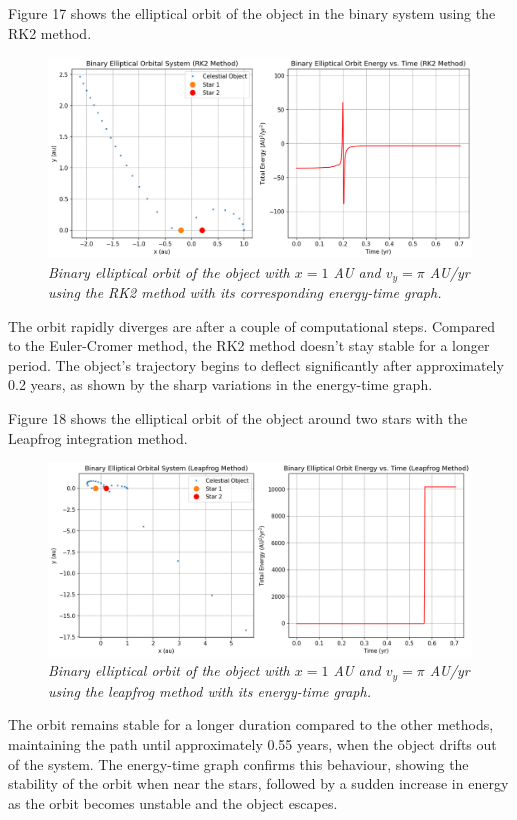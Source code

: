 \documentclass[11 pt, a4paper, twocolumn]{article}
\begin{document}
Figure 17 shows the elliptical orbit of the object in the binary system using the RK2 method.
\begin{figure}[H]
  \includegraphics[width=1\linewidth]{binaryrk2elliptic.png}
  \centering
  \caption{\textit{Binary elliptical orbit of the object with $x = 1$ AU and $v_y = \pi$ AU/yr using 
  the RK2 method with its corresponding energy-time graph.}} 
\end{figure}
The orbit rapidly diverges are after a couple of computational steps. Compared to the Euler-Cromer method,
the RK2 method doesn't stay stable for a longer period. The object's trajectory begins to deflect significantly
after approximately 0.2 years, as shown by the sharp variations in the energy-time graph.

Figure 18 shows the elliptical orbit of the object around two stars with the Leapfrog integration method.
\begin{figure}[H]
  \includegraphics[width=1\linewidth]{binaryleapfrogelliptic.png}
  \centering
  \caption{\textit{Binary elliptical orbit of the object with $x = 1$ AU and $v_y = \pi$ AU/yr using 
  the leapfrog method with its energy-time graph.}} 
\end{figure}
The orbit remains stable for a longer duration compared to the other methods, maintaining the path until
approximately 0.55 years, when the object drifts out of the system. The energy-time graph confirms this
behaviour, showing the stability of the orbit when near the stars, followed by a sudden increase in energy
as the orbit becomes unstable and the object escapes.
\end{document}
